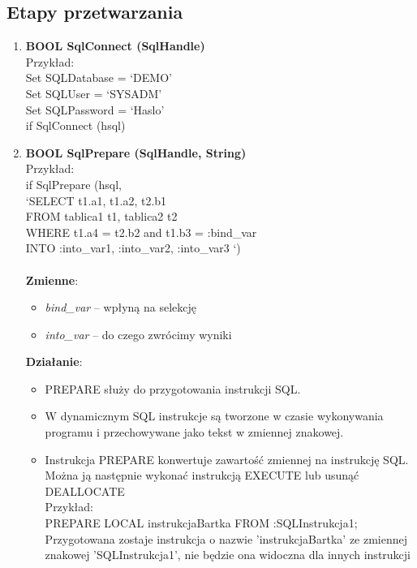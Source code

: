 \documentclass[a4paper,twoside]{article}
\begin{document}
  	\subsection*{Etapy przetwarzania}
  	\begin{enumerate}
  		\item \textbf{BOOL SqlConnect (SqlHandle)}\\
  		Przykład:\\
  		Set SQLDatabase 	= ‘DEMO’\\
  		Set SQLUser  		= ‘SYSADM’\\
  		Set SQLPassword 	= ‘Haslo’\\
  		if SqlConnect (hsql)\\
  			
  		\item \textbf{BOOL SqlPrepare (SqlHandle, String)}\\
  		Przykład:\\
  		if SqlPrepare (hsql, \\
	  	‘SELECT t1.a1, t1.a2, t2.b1 \\
  		FROM tablica1 t1, tablica2 t2\\
  		WHERE  t1.a4 = t2.b2 and t1.b3 = :bind\_var\\
  		INTO  :into\_var1, :into\_var2, :into\_var3 ‘)\\\\
  		\textbf{Zmienne}:
  		\begin{itemize}
  			\item \textit{bind\_var} – wpłyną na selekcję
  			\item \textit{into\_var} – do czego zwrócimy wyniki
  		\end{itemize}
  		\textbf{Działanie}:
  		\begin{itemize}
  			\item PREPARE służy do przygotowania instrukcji SQL.
  			\item W dynamicznym SQL instrukcje są tworzone w czasie wykonywania programu i przechowywane jako tekst w zmiennej znakowej.
  			\item Instrukcja PREPARE konwertuje zawartość zmiennej na instrukcję SQL. Można ją następnie wykonać instrukcją EXECUTE lub usunąć DEALLOCATE\\
  			Przykład:\\
  			PREPARE LOCAL instrukcjaBartka FROM :SQLInstrukcja1;\\
  			Przygotowana zostaje instrukcja o nazwie 'instrukcjaBartka' ze zmiennej znakowej 'SQLInstrukcja1', nie będzie ona widoczna dla innych instrukcji
  		\end{itemize}
  		

\end{enumerate}
\end{document}
